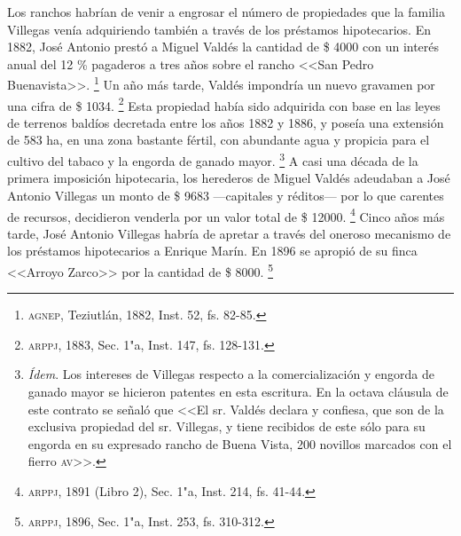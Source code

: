 \documentclass[14pt,twoside,final]{extbook} %
\let\oldfootnote\footnote
\renewcommand\footnote[1]{%
\oldfootnote{\hspace{1mm}#1}}
\begin{document}
Los ranchos habrían de venir a engrosar el número de propiedades que la familia Villegas venía adquiriendo también a través de los préstamos hipotecarios. En 1882, José Antonio prestó a Miguel Valdés la cantidad de \$ 4000 con un interés anual del 12 \% pagaderos a tres años sobre el rancho <<San Pedro Buenavista>>.\footnote{\textsc{agnep}, Teziutlán, 1882, Inst. 52, fs. 82-85.} Un año más tarde, Valdés impondría un nuevo gravamen por una cifra de \$ 1034.\footnote{\textsc{arppj}, 1883, Sec. 1"a, Inst. 147, fs. 128-131.} Esta propiedad había sido adquirida con base en las leyes de terrenos baldíos decretada entre los años 1882 y 1886, y poseía una extensión de 583 ha, en una zona bastante fértil, con abundante agua y propicia para el cultivo del tabaco y la engorda de ganado mayor.\footnote{\emph{Ídem}. Los intereses de Villegas respecto a la comercialización y engorda de ganado mayor se hicieron patentes en esta escritura. En la octava cláusula de este contrato se señaló que <<El sr. Valdés declara y confiesa, que son de la exclusiva propiedad del sr. Villegas, y tiene recibidos de este sólo para su engorda en su expresado rancho de Buena Vista, 200 novillos marcados con el fierro \textsc{av}>>.} A casi una década de la primera imposición hipotecaria, los herederos de Miguel Valdés adeudaban a José Antonio Villegas un monto de \$ 9683 ---capitales y réditos--- por lo que carentes de recursos, decidieron venderla por un valor total de \$ 12000.\footnote{\textsc{arppj}, 1891 (Libro 2), Sec. 1"a, Inst. 214, fs. 41-44.} Cinco años más tarde, José Antonio Villegas habría de apretar a través del oneroso mecanismo de los préstamos hipotecarios a Enrique Marín. En 1896 se apropió de su finca <<Arroyo Zarco>> por la cantidad de \$ 8000.\footnote{\textsc{arppj}, 1896, Sec. 1"a, Inst. 253, fs. 310-312.}
\end{document}
